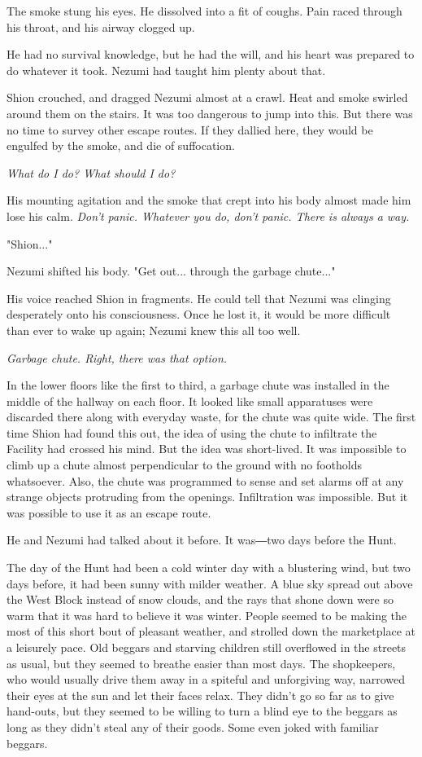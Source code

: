 The smoke stung his eyes. He dissolved into a fit of coughs. Pain raced
through his throat, and his airway clogged up.

He had no survival knowledge, but he had the will, and his heart was
prepared to do whatever it took. Nezumi had taught him plenty about
that.

Shion crouched, and dragged Nezumi almost at a crawl. Heat and smoke
swirled around them on the stairs. It was too dangerous to jump into
this. But there was no time to survey other escape routes. If they
dallied here, they would be engulfed by the smoke, and die of
suffocation.

\emph{What do I do? What should I do?}

His mounting agitation and the smoke that crept into his body almost
made him lose his calm. \emph{Don't panic. Whatever you do, don't panic. There
is always a way.}

"Shion..."

Nezumi shifted his body. "Get out... through the garbage chute..."

His voice reached Shion in fragments. He could tell that Nezumi was
clinging desperately onto his consciousness. Once he lost it, it would
be more difficult than ever to wake up again; Nezumi knew this all too
well.

\emph{Garbage chute. Right, there was that option.}

In the lower floors like the first to third, a garbage chute was
installed in the middle of the hallway on each floor. It looked like
small apparatuses were discarded there along with everyday waste, for
the chute was quite wide. The first time Shion had found this out, the
idea of using the chute to infiltrate the Facility had crossed his mind.
But the idea was short-lived. It was impossible to climb up a chute
almost perpendicular to the ground with no footholds whatsoever. Also,
the chute was programmed to sense and set alarms off at any strange
objects protruding from the openings. Infiltration was impossible. But
it was possible to use it as an escape route.

He and Nezumi had talked about it before. It was―two days before the
Hunt.

The day of the Hunt had been a cold winter day with a blustering wind,
but two days before, it had been sunny with milder weather. A blue sky
spread out above the West Block instead of snow clouds, and the rays
that shone down were so warm that it was hard to believe it was winter.
People seemed to be making the most of this short bout of pleasant
weather, and strolled down the marketplace at a leisurely pace. Old
beggars and starving children still overflowed in the streets as usual,
but they seemed to breathe easier than most days. The shopkeepers, who
would usually drive them away in a spiteful and unforgiving way,
narrowed their eyes at the sun and let their faces relax. They didn't go
so far as to give hand-outs, but they seemed to be willing to turn a
blind eye to the beggars as long as they didn't steal any of their
goods. Some even joked with familiar beggars.

